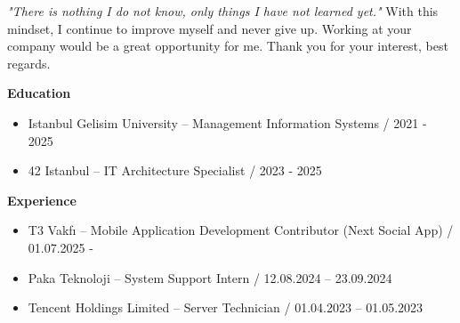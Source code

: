 \documentclass[a4paper,11pt]{article}
\begin{document}
\textit{"There is nothing I do not know, only things I have not learned yet."} With this mindset, I continue to improve myself and never give up. Working at your company would be a great opportunity for me. Thank you for your interest, best regards.

\vspace{0.3em}

\textbf{Education}
\vspace{-0.2em}
\begin{itemize}[leftmargin=2em]
  \item Istanbul Gelisim University – Management Information Systems / 2021 - 2025
  \item 42 Istanbul – IT Architecture Specialist / 2023 - 2025
\end{itemize}

\vspace{-0.1em}

\textbf{Experience}
\vspace{-0.2em}
\begin{itemize}[leftmargin=2em]
  \item T3 Vakfı – Mobile Application Development Contributor (Next Social App) / 01.07.2025 -
  \item Paka Teknoloji – System Support Intern / 12.08.2024 – 23.09.2024
  \item Tencent Holdings Limited – Server Technician / 01.04.2023 – 01.05.2023
\end{itemize}

\vspace{0.1em}
\end{document}
